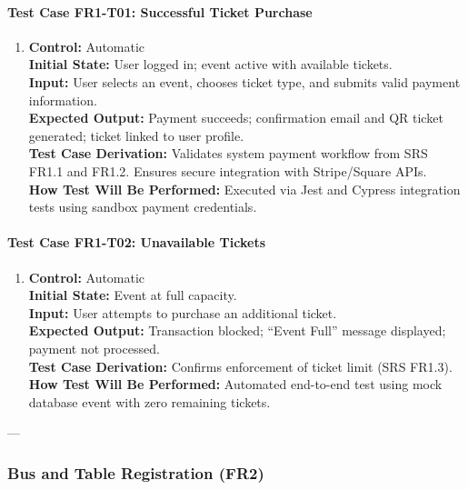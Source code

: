 \documentclass[12pt, titlepage]{article}
\begin{document}
\paragraph{Test Case FR1-T01: Successful Ticket Purchase}

\begin{enumerate}
    \item \textbf{Control:} Automatic\\
    \textbf{Initial State:} User logged in; event active with available tickets.\\
    \textbf{Input:} User selects an event, chooses ticket type, and submits valid payment information.\\
    \textbf{Expected Output:} Payment succeeds; confirmation email and QR ticket generated; ticket linked to user profile.\\
    \textbf{Test Case Derivation:} Validates system payment workflow from SRS FR1.1 and FR1.2. Ensures secure integration with Stripe/Square APIs.\\
    \textbf{How Test Will Be Performed:} Executed via Jest and Cypress integration tests using sandbox payment credentials.
\end{enumerate}

\paragraph{Test Case FR1-T02: Unavailable Tickets}

\begin{enumerate}
    \item \textbf{Control:} Automatic\\
    \textbf{Initial State:} Event at full capacity.\\
    \textbf{Input:} User attempts to purchase an additional ticket.\\
    \textbf{Expected Output:} Transaction blocked; “Event Full” message displayed; payment not processed.\\
    \textbf{Test Case Derivation:} Confirms enforcement of ticket limit (SRS FR1.3).\\
    \textbf{How Test Will Be Performed:} Automated end-to-end test using mock database event with zero remaining tickets.
\end{enumerate}

---

\subsubsection{Bus and Table Registration (FR2)}
\end{document}
